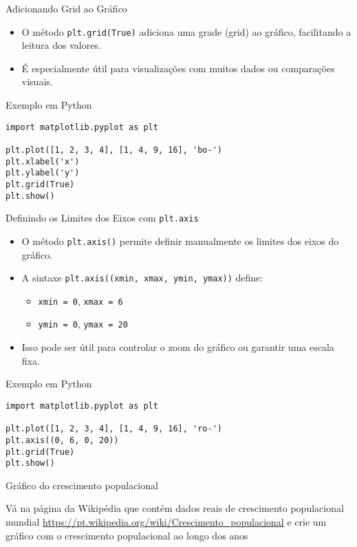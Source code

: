 \begin{frame}[fragile]{Adicionando Grid ao Gráfico}
    \begin{itemize}
        \item O método \texttt{plt.grid(True)} adiciona uma grade (grid) ao gráfico, facilitando a leitura dos valores.
        \item É especialmente útil para visualizações com muitos dados ou comparações visuais.
    \end{itemize}

    \begin{block}{Exemplo em Python}
\begin{verbatim}
import matplotlib.pyplot as plt

plt.plot([1, 2, 3, 4], [1, 4, 9, 16], 'bo-')
plt.xlabel('x')
plt.ylabel('y')
plt.grid(True)
plt.show()
\end{verbatim}
    \end{block}
\end{frame}

\begin{frame}[fragile]{Definindo os Limites dos Eixos com \texttt{plt.axis}}
    \begin{itemize}
        \item O método \texttt{plt.axis()} permite definir manualmente os limites dos eixos do gráfico.
        \item A sintaxe \texttt{plt.axis((xmin, xmax, ymin, ymax))} define:
        \begin{itemize}
            \item \texttt{xmin = 0}, \texttt{xmax = 6}
            \item \texttt{ymin = 0}, \texttt{ymax = 20}
        \end{itemize}
        \item Isso pode ser útil para controlar o zoom do gráfico ou garantir uma escala fixa.
    \end{itemize}

    \begin{block}{Exemplo em Python}
\begin{verbatim}
import matplotlib.pyplot as plt

plt.plot([1, 2, 3, 4], [1, 4, 9, 16], 'ro-')
plt.axis((0, 6, 0, 20))
plt.grid(True)
plt.show()
\end{verbatim}
    \end{block}
\end{frame}

\begin{frame}{Gráfico do crescimento populacional}

Vá na página da Wikipédia que contém dados reais de crescimento populacional mundial  \url{https://pt.wikipedia.org/wiki/Crescimento_populacional} e crie um gráfico com o crescimento populacional ao longo dos anos

    
\end{frame}


